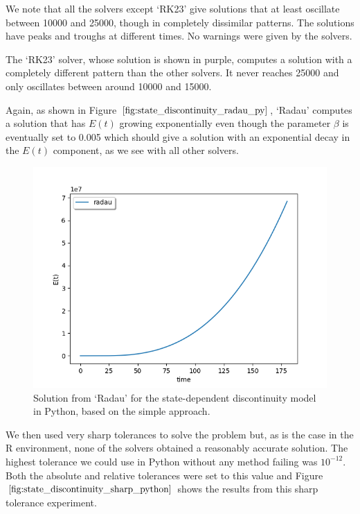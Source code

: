 We note that all the solvers except `RK23' give solutions that at least oscillate between 10000 and 25000, though in completely dissimilar patterns. The solutions have peaks and troughs at different times. No warnings were given by the solvers.

The `RK23' solver, whose solution is shown in purple, computes a solution with a completely different pattern than the other solvers. It never reaches 25000 and only oscillates between around 10000 and 15000. 

Again, as shown in Figure $\ref{fig:state_discontinuity_radau_py}$, `Radau' computes a solution that has $E(t)$ growing exponentially even though the parameter $\beta$ is eventually set to 0.005 which should give a solution with an exponential decay in the $E(t)$ component, as we see with all other solvers.

\begin{figure}[h]
\centering
\includegraphics[width=0.7\linewidth]{./figures/state_discontinuity_radau_py}
\caption{Solution from `Radau' for the state-dependent discontinuity model in Python, based on the simple approach.}
\label{fig:state_discontinuity_radau_py}
\end{figure}

We then used very sharp tolerances to solve the problem but, as is the case in the R environment, none of the solvers obtained a reasonably accurate solution. The highest tolerance we could use in Python without any method failing was $10^{-12}$. Both the absolute and relative tolerances were set to this value and Figure $\ref{fig:state_discontinuity_sharp_python}$ shows the results from this sharp tolerance experiment.

